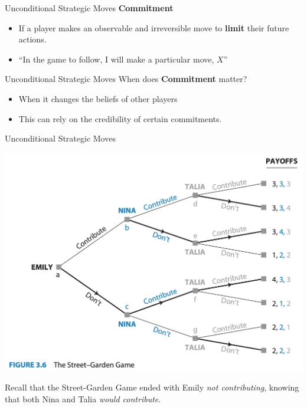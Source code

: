 
\begin{frame}{Unconditional Strategic Moves}
  \textbf{\alert{Commitment}}
  \begin{itemize}
    \item If a player makes an observable and irreversible move to 
    \textbf{limit} their future actions.
    \item ``In the game to follow, I will make a particular move, $X$''
  \end{itemize} 
\end{frame}


\begin{frame}{Unconditional Strategic Moves}
  When does \textbf{\alert{Commitment}} matter?
  \begin{itemize}
    \item When it changes the beliefs of other players
    \item This can rely on the \alert{credibility} of certain commitments.
  \end{itemize} 
\end{frame}


\begin{frame}{Unconditional Strategic Moves}
  \begin{center}
    \includegraphics[width=.6\textwidth]{figures/fig3.6.png}
  \end{center}
  Recall that the Street-Garden Game ended with \alert{Emily} \textit{not contributing},
  knowing that both \alert{Nina} and \alert{Talia} \textit{would contribute}.
\end{frame}

